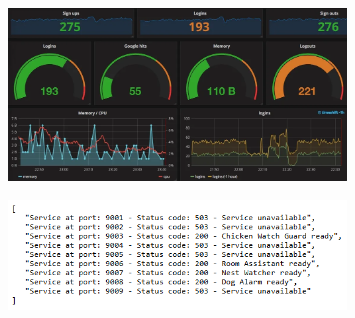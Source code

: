 \begin{figure}[H]
    \centering
    \includegraphics[width=0.8\textwidth]{img/health-checker-grafana-dashboard}
    \label{fig:health-checker-grafana-dashboard}
\end{figure}
\begin{figure}[H]
    \centering
    \includegraphics[width=0.8\textwidth]{img/healthchecker_report}
    \label{fig:healthchecker_report}
\end{figure}